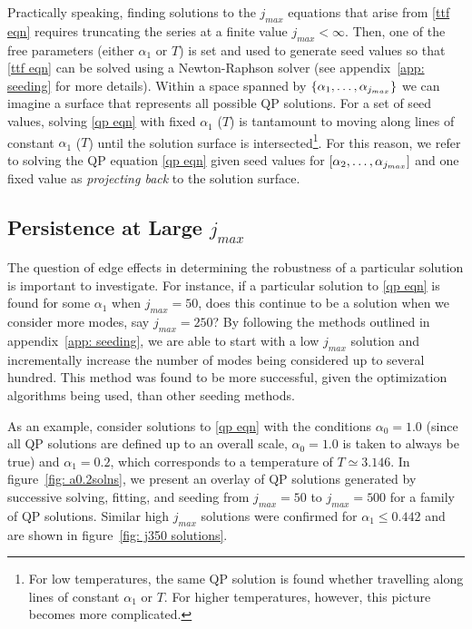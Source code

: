 \documentclass[../PhD.tex]{subfiles}
\begin{document}
Practically speaking, finding solutions to the $j_{max}$ equations that arise from \eqref{ttf eqn} requires truncating the series at a finite value $j_{max} < \infty$. Then, one of the free parameters (either $\alpha_1$ or $T$) is set and used to generate seed values so that \eqref{ttf eqn} can be solved using a Newton-Raphson solver (see appendix~\ref{app: seeding} for more details). Within a space spanned by $\{\alpha_1, \ldots, \alpha_{j_{max}} \}$ we can imagine a surface that represents all possible QP solutions. For a set of seed values, solving \eqref{qp eqn} with fixed $\alpha_1$ ($T$) is tantamount to moving along lines of constant $\alpha_1$ ($T$) until the solution surface is intersected\footnote{For low temperatures, the same QP solution is found whether travelling along lines of constant $\alpha_1$ or $T$. For higher temperatures, however, this picture becomes more complicated.}. For this reason, we refer to solving the QP equation \eqref{qp eqn} given seed values for ${[ \alpha_2, \ldots, \alpha_{j_{max}} ]}$ and one fixed value as \emph{projecting back} to the solution surface.


\subsection{Persistence at Large $j_{max}$}
\label{ssec: large jmax}

The question of edge effects in determining the robustness of a particular solution is important to investigate. For instance, if a particular solution to \eqref{qp eqn} is found for some $\alpha_1$ when $j_{max} = 50$, does this continue to be a solution when we consider more modes, say $j_{max} = 250$? By following the methods outlined in appendix~\ref{app: seeding}, we are able to start with a low $j_{max}$ solution and incrementally increase the number of modes being considered up to several hundred. This method was found to be more successful, given the optimization algorithms being used, than other seeding methods.

As an example, consider solutions to \eqref{qp eqn} with the conditions $\alpha_0 = 1.0$ (since all QP solutions are defined up to an overall scale, $\alpha_0 = 1.0$ is taken to always be true) and $\alpha_1 = 0.2$, which corresponds to a temperature of $T \simeq 3.146$. In figure~\ref{fig: a0.2solns}, we present an overlay of QP solutions generated by successive solving, fitting, and seeding from $j_{max} = 50$ to $j_{max}=500$ for a family of QP solutions. Similar high $j_{max}$ solutions were confirmed for $\alpha_1 \leq 0.442$ and are shown in figure~\ref{fig: j350 solutions}.
\end{document}
